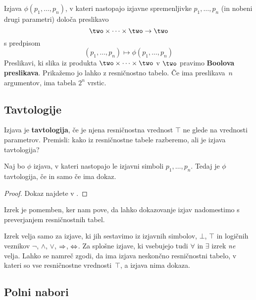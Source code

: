Izjava $\phi(p_1, \ldots, p_n)$, v kateri nastopajo izjavne spremenljivke $p_1, \ldots, p_n$ (in nobeni drugi parametri) določa preslikavo
%
\begin{equation*}
  \two \times \cdots \times \two \to \two
\end{equation*}
%
s predpisom
%
\begin{equation*}
    (p_1, \ldots, p_n) \mapsto \phi(p_1, \ldots, p_n)
\end{equation*}
%
Preslikavi, ki slika iz produkta $\two \times \cdots \times \two$ v $\two$ pravimo \textbf{Boolova preslikava}. Prikažemo jo lahko z resničnostno tabelo. Če ima preslikava~$n$ argumentov, ima tabela $2^n$ vrstic.


\subsection{Tavtologije}

Izjava je \textbf{tavtologija}, če je njena resničnostna vrednost $\top$ ne glede na
vrednosti parametrov. Premisli: kako iz resničnostne tabele razberemo, ali je
izjava tavtologija?

\begin{izrek}
  Naj bo $\phi$ izjava, v kateri nastopajo le izjavni simboli
  $p_1,\ldots,p_n$. Tedaj je $\phi$ tavtologija, če in samo če ima dokaz.
\end{izrek}

\begin{proof}
  Dokaz najdete v \cite{prijatelj92:_osnov}.
\end{proof}

\noindent
%
Izrek je pomemben, ker nam pove, da lahko dokazovanje izjav nadomestimo s preverjanjem resničnostnih tabel.

\begin{opomba}
  Izrek velja samo za izjave, ki jih sestavimo iz izjavnih simbolov, $\bot$, $\top$ in
  logičnih veznikov $\neg$, $\land$, $\lor$, $\Rightarrow$, $\Leftrightarrow$. Za splošne izjave, ki vsebujejo tudi $\forall$ in $\exists$ izrek \emph{ne} velja. Lahko se namreč zgodi, da ima izjava neskončno resničnostni tabelo, v kateri so vse resničnostne vrednosti~$\top$, a izjava nima dokaza.
\end{opomba}

\subsection{Polni nabori}

